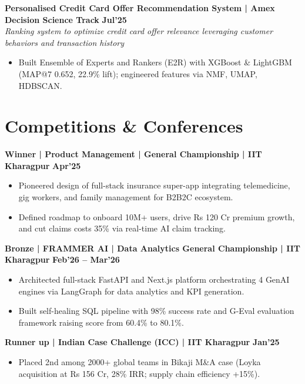 \documentclass[10pt, a4paper]{article}
\newenvironment{achievelist}{
  \begin{itemize}[leftmargin=1.2em, itemsep=0.5pt, parsep=0pt, topsep=1pt]
    \small
}{
  \end{itemize}
  \vspace{-2pt}
}
\newcommand{\achieve}[1]{\item #1}
\begin{document}
\textbf{Personalised Credit Card Offer Recommendation System | Amex Decision Science Track} \hfill \textbf{\small Jul'25} \\
\textit{\small Ranking system to optimize credit card offer relevance leveraging customer behaviors and transaction history}
\begin{achievelist}
  \achieve{Built Ensemble of Experts and Rankers (E2R) with XGBoost \& LightGBM (MAP@7 0.652, 22.9\% lift); engineered features via NMF, UMAP, HDBSCAN.}
\end{achievelist}

\vspace{-2pt}

\section{Competitions \& Conferences}

\textbf{Winner | Product Management | General Championship | IIT Kharagpur} \hfill \textbf{\small Apr'25} \\
\begin{achievelist}
  \achieve{Pioneered design of full-stack insurance super-app integrating telemedicine, gig workers, and family management for B2B2C ecosystem.}
  \achieve{Defined roadmap to onboard 10M+ users, drive Rs 120 Cr premium growth, and cut claims costs 35\% via real-time AI claim tracking.}
\end{achievelist}

\textbf{Bronze | FRAMMER AI | Data Analytics General Championship | IIT Kharagpur} \hfill \textbf{\small Feb'26 -- Mar'26} \\
\begin{achievelist}
  \achieve{Architected full-stack FastAPI and Next.js platform orchestrating 4 GenAI engines via LangGraph for data analytics and KPI generation.}
  \achieve{Built self-healing SQL pipeline with 98\% success rate and G-Eval evaluation framework raising score from 60.4\% to 80.1\%.}
\end{achievelist}

\textbf{Runner up | Indian Case Challenge (ICC) | IIT Kharagpur} \hfill \textbf{\small Jan'25} \\
\begin{achievelist}
  \achieve{Placed 2nd among 2000+ global teams in Bikaji M\&A case (Loyka acquisition at Rs 156 Cr, 28\% IRR; supply chain efficiency +15\%).}
\end{achievelist}
\end{document}

